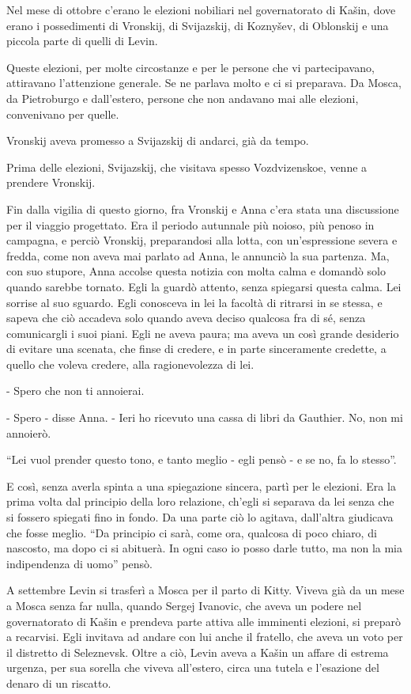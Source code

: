 Nel mese di ottobre c'erano le elezioni nobiliari nel governatorato di Kašin, dove erano i possedimenti di Vronskij, di Svijazskij, di Koznyšev, di Oblonskij e una piccola parte di quelli di Levin. 

Queste elezioni, per molte circostanze e per le persone che vi partecipavano, attiravano l'attenzione generale. Se ne parlava molto e ci si preparava. Da Mosca, da Pietroburgo e dall'estero, persone che non andavano mai alle elezioni, convenivano per quelle. 

Vronskij aveva promesso a Svijazskij di andarci, già da tempo. 

Prima delle elezioni, Svijazskij, che visitava spesso Vozdvizenskoe, venne a prendere Vronskij. 

Fin dalla vigilia di questo giorno, fra Vronskij e Anna c'era stata una discussione per il viaggio progettato. Era il periodo autunnale più noioso, più penoso in campagna, e perciò Vronskij, preparandosi alla lotta, con un'espressione severa e fredda, come non aveva mai parlato ad Anna, le annunciò la sua partenza. Ma, con suo stupore, Anna accolse questa notizia con molta calma e domandò solo quando sarebbe tornato. Egli la guardò attento, senza spiegarsi questa calma. Lei sorrise al suo sguardo. Egli conosceva in lei la facoltà di ritrarsi in se stessa, e sapeva che ciò accadeva solo quando aveva deciso qualcosa fra di sé, senza comunicargli i suoi piani. Egli ne aveva paura; ma aveva un così grande desiderio di evitare una scenata, che finse di credere, e in parte sinceramente credette, a quello che voleva credere, alla ragionevolezza di lei. 

- Spero che non ti annoierai. 

- Spero - disse Anna. - Ieri ho ricevuto una cassa di libri da Gauthier. No, non mi annoierò. 

``Lei vuol prender questo tono, e tanto meglio - egli pensò - e se no, fa lo stesso''. 

E così, senza averla spinta a una spiegazione sincera, partì per le elezioni. Era la prima volta dal principio della loro relazione, ch'egli si separava da lei senza che si fossero spiegati fino in fondo. Da una parte ciò lo agitava, dall'altra giudicava che fosse meglio. ``Da principio ci sarà, come ora, qualcosa di poco chiaro, di nascosto, ma dopo ci si abituerà. In ogni caso io posso darle tutto, ma non la mia indipendenza di uomo'' pensò. 

A settembre Levin si trasferì a Mosca per il parto di Kitty. Viveva già da un mese a Mosca senza far nulla, quando Sergej Ivanovic, che aveva un podere nel governatorato di Kašin e prendeva parte attiva alle imminenti elezioni, si preparò a recarvisi. Egli invitava ad andare con lui anche il fratello, che aveva un voto per il distretto di Seleznevsk. Oltre a ciò, Levin aveva a Kašin un affare di estrema urgenza, per sua sorella che viveva all'estero, circa una tutela e l'esazione del denaro di un riscatto. 

